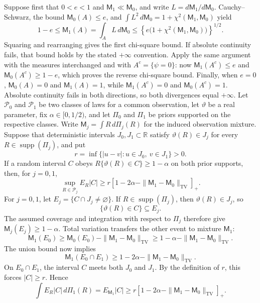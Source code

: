 Suppose first that \(0<e<1\) and \(\mathsf M_1\ll\mathsf M_0\), and write \(L=d\mathsf M_1/d\mathsf M_0\).  Cauchy--Schwarz, the bound \(\mathsf M_0(A)\le e\), and \(\int L^2\,d\mathsf M_0=1+\chi^2(\mathsf M_1,\mathsf M_0)\) yield
\[
 1-e
 \le \mathsf M_1(A)
 =\int_A L\,d\mathsf M_0
 \le \left\{e\bigl(1+\chi^2(\mathsf M_1,\mathsf M_0)\bigr)\right\}^{1/2}.
\]
Squaring and rearranging gives the first chi-square bound.  If absolute continuity fails, that bound holds by the stated \(+\infty\) convention.  Apply the same argument with the measures interchanged and with \(A^c=\{\psi=0\}\): now \(\mathsf M_1(A^c)\le e\) and \(\mathsf M_0(A^c)\ge1-e\), which proves the reverse chi-square bound.  Finally, when \(e=0\), \(\mathsf M_0(A)=0\) and \(\mathsf M_1(A)=1\), while \(\mathsf M_1(A^c)=0\) and \(\mathsf M_0(A^c)=1\).  Absolute continuity fails in both directions, so both divergences equal \(+\infty\).
Let \(\mathcal P_0\) and \(\mathcal P_1\) be two classes of laws for a common observation, let \(\vartheta\) be a real parameter, fix \(\alpha\in[0,1/2)\), and let \(\Pi_0\) and \(\Pi_1\) be priors supported on the respective classes.  Write \(\mathsf M_j=\int R\,d\Pi_j(R)\) for the induced observation mixture.  Suppose that deterministic intervals \(J_0,J_1\subset\mathbb R\) satisfy \(\vartheta(R)\in J_j\) for every \(R\in\operatorname{supp}(\Pi_j)\), and put
\[
 r=\inf\{|u-v|:u\in J_0,\ v\in J_1\}>0.
\]
If a random interval \(C\) obeys \(R\{\vartheta(R)\in C\}\ge1-\alpha\) on both prior supports, then, for \(j=0,1\),
\[
 \sup_{R\in\mathcal P_j}E_R|C|
 \ge
 r\left[1-2\alpha-\|\mathsf M_1-\mathsf M_0\|_{\mathrm{TV}}\right]_+.
\]
For \(j=0,1\), let \(E_j=\{C\cap J_j\ne\varnothing\}\).  If \(R\in\operatorname{supp}(\Pi_j)\), then \(\vartheta(R)\in J_j\), so
\[
 \{\vartheta(R)\in C\}\subseteq E_j.
\]
The assumed coverage and integration with respect to \(\Pi_j\) therefore give \(\mathsf M_j(E_j)\ge1-\alpha\).  Total variation transfers the other event to mixture \(\mathsf M_1\):
\[
 \mathsf M_1(E_0)
 \ge \mathsf M_0(E_0)-\|\mathsf M_1-\mathsf M_0\|_{\mathrm{TV}}
 \ge1-\alpha-\|\mathsf M_1-\mathsf M_0\|_{\mathrm{TV}}.
\]
The union bound now implies
\[
 \mathsf M_1(E_0\cap E_1)
 \ge1-2\alpha-\|\mathsf M_1-\mathsf M_0\|_{\mathrm{TV}}.
\]
On \(E_0\cap E_1\), the interval \(C\) meets both \(J_0\) and \(J_1\).  By the definition of \(r\), this forces \(|C|\ge r\).  Hence
\[
 \int E_R|C|\,d\Pi_1(R)
 =E_{\mathsf M_1}|C|
 \ge r\left[1-2\alpha-\|\mathsf M_1-\mathsf M_0\|_{\mathrm{TV}}\right]_+.
\]
